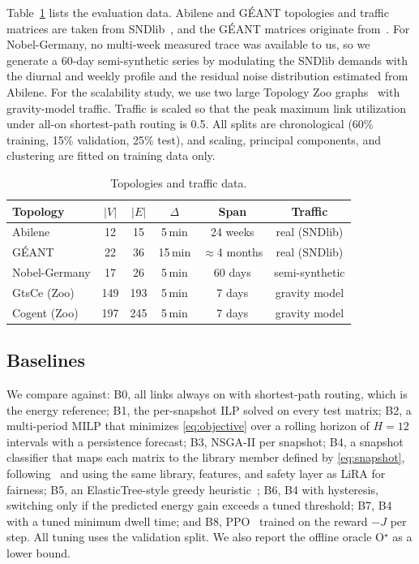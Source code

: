 \documentclass[conference]{IEEEtran}
\begin{document}
Table~\ref{tab:datasets} lists the evaluation data. Abilene and G\'{E}ANT topologies and traffic matrices are taken from SNDlib~\cite{orlowski2010sndlib}, and the G\'{E}ANT matrices originate from~\cite{uhlig2006geant}. For Nobel-Germany, no multi-week measured trace was available to us, so we generate a 60-day semi-synthetic series by modulating the SNDlib demands with the diurnal and weekly profile and the residual noise distribution estimated from Abilene. For the scalability study, we use two large Topology Zoo graphs~\cite{knight2011zoo} with gravity-model traffic. Traffic is scaled so that the peak maximum link utilization under all-on shortest-path routing is 0.5. All splits are chronological (60\% training, 15\% validation, 25\% test), and scaling, principal components, and clustering are fitted on training data only.

\begin{table}[t]
\centering
\caption{Topologies and traffic data.}
\label{tab:datasets}
\footnotesize
\setlength{\tabcolsep}{3pt}
\begin{tabular}{@{}lccccc@{}}
\toprule
Topology & $|V|$ & $|E|$ & $\Delta$ & Span & Traffic \\
\midrule
Abilene & 12 & 15 & 5\,min & 24 weeks & real (SNDlib) \\
G\'{E}ANT & 22 & 36 & 15\,min & $\approx$4 months & real (SNDlib) \\
Nobel-Germany & 17 & 26 & 5\,min & 60 days & semi-synthetic \\
GtsCe (Zoo) & 149 & 193 & 5\,min & 7 days & gravity model \\
Cogent (Zoo) & 197 & 245 & 5\,min & 7 days & gravity model \\
\bottomrule
\end{tabular}
\end{table}

\subsection{Baselines}

We compare against: B0, all links always on with shortest-path routing, which is the energy reference; B1, the per-snapshot ILP solved on every test matrix; B2, a multi-period MILP that minimizes \eqref{eq:objective} over a rolling horizon of $H=12$ intervals with a persistence forecast; B3, NSGA-II per snapshot; B4, a snapshot classifier that maps each matrix to the library member defined by \eqref{eq:snapshot}, following~\cite{gomezdelahiz2025noms,gomezdelahiz2026tgcn} and using the same library, features, and safety layer as LiRA for fairness; B5, an ElasticTree-style greedy heuristic~\cite{heller2010elastictree}; B6, B4 with hysteresis, switching only if the predicted energy gain exceeds a tuned threshold; B7, B4 with a tuned minimum dwell time; and B8, PPO~\cite{schulman2017ppo} trained on the reward $-J$ per step. All tuning uses the validation split. We also report the offline oracle O$^\star$ as a lower bound.
\end{document}

